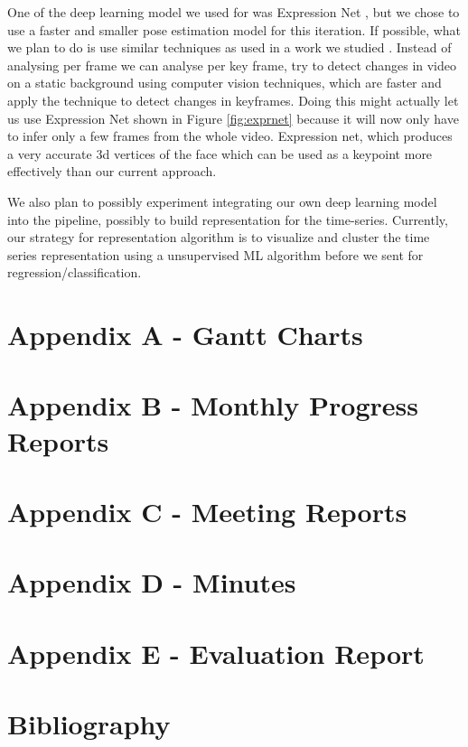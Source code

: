 \documentclass[12pt,a4paper,man]{report}
\begin{document}
One of the deep learning model we used for was Expression Net \cite{chang17expnet}, but we chose to use a faster and smaller pose estimation model for this iteration. If possible, what we plan to do is use similar techniques as used in a work we studied \cite{saha2018unsupervised}. Instead of analysing per frame we can analyse per key frame, try to detect changes in video on a static background using computer vision techniques, which are faster and apply the technique to detect changes in keyframes. Doing this might actually let us use Expression Net shown in Figure  \ref{fig:exprnet} because it will now only have to infer only a few frames from the whole video. Expression net, which produces a very accurate 3d vertices of the face which can be used as a keypoint more effectively than our current approach.

We also plan to possibly experiment integrating our own deep learning model into the pipeline, possibly to build representation for the time-series. Currently, our strategy for representation algorithm is to visualize and cluster the time series representation using a unsupervised ML algorithm before we sent for regression/classification.



\part{Appendix A - Gantt Charts}
\label{sec:org37dbcf2}



\part{Appendix B - Monthly Progress Reports}
\label{sec:org836eedf}


\part{Appendix C - Meeting Reports}
\label{sec:org438d969}


\part{Appendix D - Minutes}
\label{sec:org8fb5db3}


\part{Appendix E - Evaluation Report}
\label{sec:orga86345e}





\part{Bibliography}
\label{sec:org6769339}
\printglossaries



\end{document}
